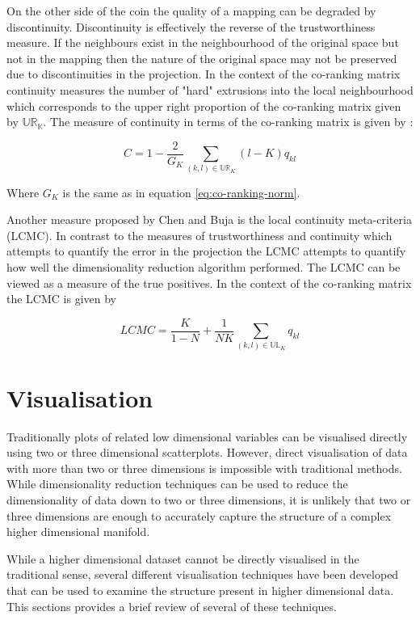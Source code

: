 On the other side of the coin the quality of a mapping can be degraded by discontinuity. Discontinuity is effectively the reverse of the trustworthiness measure. If the neighbours exist in the neighbourhood of the original space but not in the mapping then the nature of the original space may not be preserved due to discontinuities in the projection. In the context of the co-ranking matrix continuity measures the number of "hard" extrusions into the local neighbourhood which corresponds to the upper right proportion of the co-ranking matrix given by $\mathbb{UR_K}$. The measure of continuity in terms of the co-ranking matrix is given by \cite{lee2009quality}:

\begin{equation}
	C = 1 - \frac{2}{G_{K}} \sum\limits_{(k,l) \in \mathbb{UR}_K} (l - K)q_{kl}
\end{equation}

Where $G_K$ is the same as in equation \ref{eq:co-ranking-norm}.

Another measure proposed by Chen and Buja \cite{chen2009local} is the local continuity meta-criteria (LCMC). In contrast to the measures of trustworthiness and continuity which attempts to quantify the error in the projection the LCMC attempts to quantify how well the dimensionality reduction algorithm performed. The LCMC can be viewed as a measure of the true positives. In the context of the co-ranking matrix the LCMC is given by

\begin{equation}
	LCMC = \frac{K}{1 - N} + \frac{1}{NK} \sum\limits_{(k,l) \in \mathbb{UL}_K} q_{kl}
\end{equation}

\section{Visualisation}
\label{sec:visualisation}
Traditionally plots of related low dimensional variables can be visualised directly using two or three dimensional scatterplots. However, direct visualisation of data with more than two or three dimensions is impossible with traditional methods. While dimensionality reduction techniques can be used to reduce the dimensionality of data down to two or three dimensions, it is unlikely that two or three dimensions are enough to accurately capture the structure of a complex higher dimensional manifold.

While a higher dimensional dataset cannot be directly visualised in the traditional sense, several different visualisation techniques have been developed that can be used to examine the structure present in higher dimensional data. This sections provides a brief review of several of these techniques.

